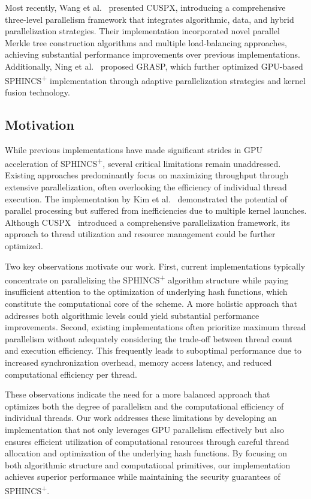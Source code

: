 \documentclass[journal]{IEEEtran}
\begin{document}
Most recently, Wang et al.~\cite{Wang2025} presented CUSPX, introducing a comprehensive three-level parallelism framework that integrates algorithmic, data, and hybrid parallelization strategies. Their implementation incorporated novel parallel Merkle tree construction algorithms and multiple load-balancing approaches, achieving substantial performance improvements over previous implementations. Additionally, Ning et al.~\cite{Ning2024} proposed GRASP, which further optimized GPU-based SPHINCS\textsuperscript{+} implementation through adaptive parallelization strategies and kernel fusion technology.

\subsection{Motivation}

\color{blue}

While previous implementations have made significant strides in GPU acceleration of SPHINCS\textsuperscript{+}, several critical limitations remain unaddressed. Existing approaches predominantly focus on maximizing throughput through extensive parallelization, often overlooking the efficiency of individual thread execution. The implementation by Kim et al.~\cite{Kim2024} demonstrated the potential of parallel processing but suffered from inefficiencies due to multiple kernel launches. Although CUSPX~\cite{Wang2025} introduced a comprehensive parallelization framework, its approach to thread utilization and resource management could be further optimized.

Two key observations motivate our work. First, current implementations typically concentrate on parallelizing the SPHINCS\textsuperscript{+} algorithm structure while paying insufficient attention to the optimization of underlying hash functions, which constitute the computational core of the scheme. A more holistic approach that addresses both algorithmic levels could yield substantial performance improvements. Second, existing implementations often prioritize maximum thread parallelism without adequately considering the trade-off between thread count and execution efficiency. This frequently leads to suboptimal performance due to increased synchronization overhead, memory access latency, and reduced computational efficiency per thread.

These observations indicate the need for a more balanced approach that optimizes both the degree of parallelism and the computational efficiency of individual threads. Our work addresses these limitations by developing an implementation that not only leverages GPU parallelism effectively but also ensures efficient utilization of computational resources through careful thread allocation and optimization of the underlying hash functions. By focusing on both algorithmic structure and computational primitives, our implementation achieves superior performance while maintaining the security guarantees of SPHINCS\textsuperscript{+}.
\end{document}
